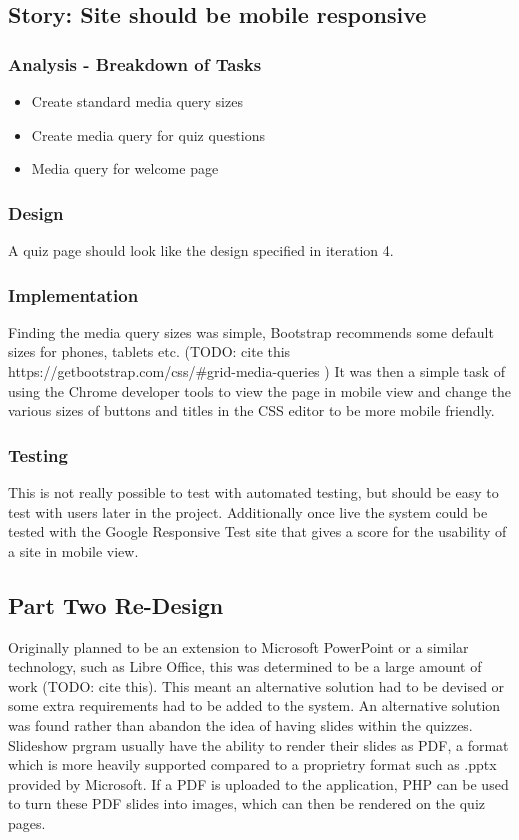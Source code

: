 \subsection{Story: Site should be mobile responsive}
\subsubsection{Analysis - Breakdown of Tasks}
\begin{itemize}
	\item Create standard media query sizes
	\item Create media query for quiz questions
	\item Media query for welcome page
\end{itemize}
\subsubsection{Design}
A quiz page should look like the design specified in iteration 4.
\subsubsection{Implementation}
Finding the media query sizes was simple, Bootstrap recommends some default sizes for phones, tablets etc. (TODO: cite this https://getbootstrap.com/css/\#grid-media-queries ) It was then a simple task of using the Chrome developer tools to view the page in mobile view and change the various sizes of buttons and titles in the CSS editor to be more mobile friendly.
\subsubsection{Testing}
This is not really possible to test with automated testing, but should be easy to test with users later in the project. Additionally once live the system could be tested with the Google Responsive Test site that gives a score for the usability of a site in mobile view.
\newpage

\subsection{Part Two Re-Design}
Originally planned to be an extension to Microsoft PowerPoint or a similar technology, such as Libre Office, this was determined to be a large amount of work (TODO: cite this). This meant an alternative solution had to be devised or some extra requirements had to be added to the system. An alternative solution was found rather than abandon the idea of having slides within the quizzes. Slideshow prgram usually have the ability to render their slides as PDF, a format which is more heavily supported compared to a proprietry format such as .pptx provided by Microsoft. If a PDF is uploaded to the application, PHP can be used to turn these PDF slides into images, which can then be rendered on the quiz pages.

